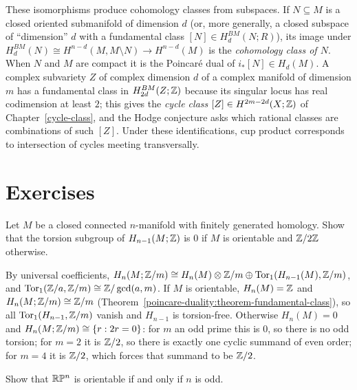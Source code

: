 \begin{remark}\label{poincare-duality:remark-fundamental-classes-subspaces}
These isomorphisms produce cohomology classes from subspaces. If $N \subseteq M$ is a closed oriented submanifold of dimension $d$ (or, more generally, a closed subspace of
``dimension'' $d$ with a fundamental class $[N] \in H^{BM}_d(N; R)$), its image under $H^{BM}_d(N) \cong H^{n-d}(M, M \setminus N) \to H^{n-d}(M)$ is the \emph{cohomology class of $N$}.
When $N$ and $M$ are compact it is the Poincar\'e dual of $i_*[N] \in H_d(M)$. A complex subvariety $Z$ of complex dimension $d$ of a complex manifold of dimension $m$ has a
fundamental class in $H^{BM}_{2d}(Z; \mathbb{Z})$ because its singular locus has real codimension at least $2$; this gives the \emph{cycle class} $[Z] \in H^{2m-2d}(X; \mathbb{Z})$ of
Chapter~\ref{cycle-class}, and the Hodge conjecture asks which rational classes are combinations of such $[Z]$. Under these identifications, cup product corresponds to
intersection of cycles meeting transversally.
\end{remark}

\section{Exercises}\label{poincare-duality:section-exercises}

\begin{exercise}\label{poincare-duality:exercise-torsion-top}
Let $M$ be a closed connected $n$-manifold with finitely generated homology. Show that the torsion subgroup of $H_{n-1}(M; \mathbb{Z})$ is $0$ if $M$ is orientable and $\mathbb{Z}/2\mathbb{Z}$ otherwise.
\end{exercise}

\begin{solution}
By universal coefficients, $H_n(M; \mathbb{Z}/m) \cong H_n(M) \otimes \mathbb{Z}/m \oplus \operatorname{Tor}_1(H_{n-1}(M), \mathbb{Z}/m)$, and $\operatorname{Tor}_1(\mathbb{Z}/a, \mathbb{Z}/m) \cong \mathbb{Z}/\gcd(a, m)$. If $M$ is orientable, $H_n(M) = \mathbb{Z}$ and
$H_n(M; \mathbb{Z}/m) \cong \mathbb{Z}/m$ (Theorem~\ref{poincare-duality:theorem-fundamental-class}), so all $\operatorname{Tor}_1(H_{n-1}, \mathbb{Z}/m)$ vanish and $H_{n-1}$ is torsion-free. Otherwise $H_n(M) = 0$ and
$H_n(M; \mathbb{Z}/m) \cong \{r : 2r = 0\}$: for $m$ an odd prime this is $0$, so there is no odd torsion; for $m = 2$ it is $\mathbb{Z}/2$, so there is exactly one cyclic summand of even order; for
$m = 4$ it is $\mathbb{Z}/2$, which forces that summand to be $\mathbb{Z}/2$.
\end{solution}

\begin{exercise}\label{poincare-duality:exercise-projective-orientability}
Show that $\mathbb{R}\mathbb{P}^n$ is orientable if and only if $n$ is odd.
\end{exercise}

